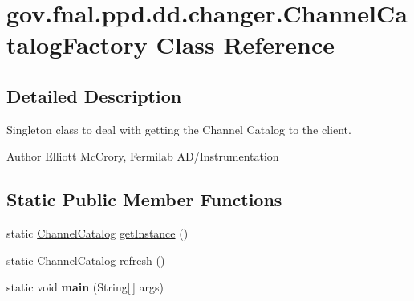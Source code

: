 \hypertarget{classgov_1_1fnal_1_1ppd_1_1dd_1_1changer_1_1ChannelCatalogFactory}{\section{gov.\-fnal.\-ppd.\-dd.\-changer.\-Channel\-Catalog\-Factory Class Reference}
\label{classgov_1_1fnal_1_1ppd_1_1dd_1_1changer_1_1ChannelCatalogFactory}
}


\subsection{Detailed Description}
Singleton class to deal with getting the Channel Catalog to the client.

\begin{DoxyAuthor}{Author}
Elliott Mc\-Crory, Fermilab A\-D/\-Instrumentation 
\end{DoxyAuthor}
\subsection*{Static Public Member Functions}
\begin{DoxyCompactItemize}
\item 
static \hyperlink{interfacegov_1_1fnal_1_1ppd_1_1dd_1_1interfaces_1_1ChannelCatalog}{Channel\-Catalog} \hyperlink{classgov_1_1fnal_1_1ppd_1_1dd_1_1changer_1_1ChannelCatalogFactory_ac77dd407ecb474093b11431593b52540}{get\-Instance} ()
\item 
static \hyperlink{interfacegov_1_1fnal_1_1ppd_1_1dd_1_1interfaces_1_1ChannelCatalog}{Channel\-Catalog} \hyperlink{classgov_1_1fnal_1_1ppd_1_1dd_1_1changer_1_1ChannelCatalogFactory_a10180eb261e098698ee6c87b0d530380}{refresh} ()
\item 
\hypertarget{classgov_1_1fnal_1_1ppd_1_1dd_1_1changer_1_1ChannelCatalogFactory_acc9cbf325f30beadd4c3e227deb94c21}{static void {\bfseries main} (String\mbox{[}$\,$\mbox{]} args)}\label{classgov_1_1fnal_1_1ppd_1_1dd_1_1changer_1_1ChannelCatalogFactory_acc9cbf325f30beadd4c3e227deb94c21}

\end{DoxyCompactItemize}


